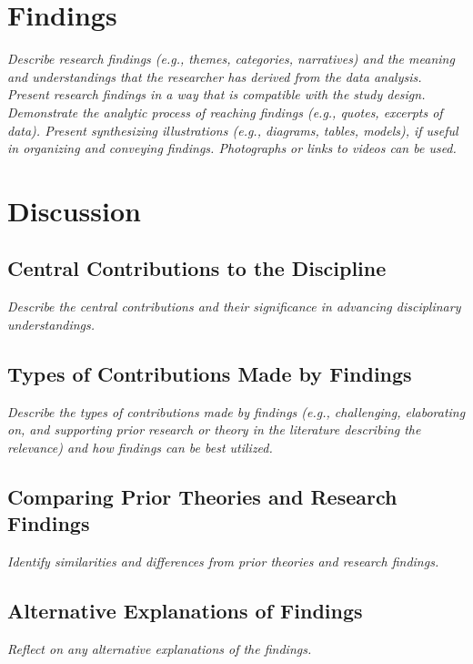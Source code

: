 \documentclass[acmsmall]{acmart}
\begin{document}
\section{Findings}

{\em\small Describe research findings (e.g., themes, categories, narratives) and the meaning and understandings that the researcher has derived from the data analysis. Present research findings in a way that is compatible with the study design. Demonstrate the analytic process of reaching findings (e.g., quotes, excerpts of data). Present synthesizing illustrations (e.g., diagrams, tables, models), if useful in organizing and conveying findings. Photographs or links to videos can be used. }

\section{Discussion}

\subsection{Central Contributions to the Discipline}

{\em\small Describe the central contributions and their significance in advancing disciplinary understandings.}

\subsection{Types of Contributions Made by Findings}

{\em\small Describe the types of contributions made by findings (e.g., challenging, elaborating on, and supporting prior research or theory in the literature describing the relevance) and how findings can be best utilized. }

\subsection{Comparing Prior Theories and Research Findings}

{\em\small Identify similarities and differences from prior theories and research findings.}

\subsection{Alternative Explanations of Findings}

{\em\small Reflect on any alternative explanations of the findings.}
\end{document}
